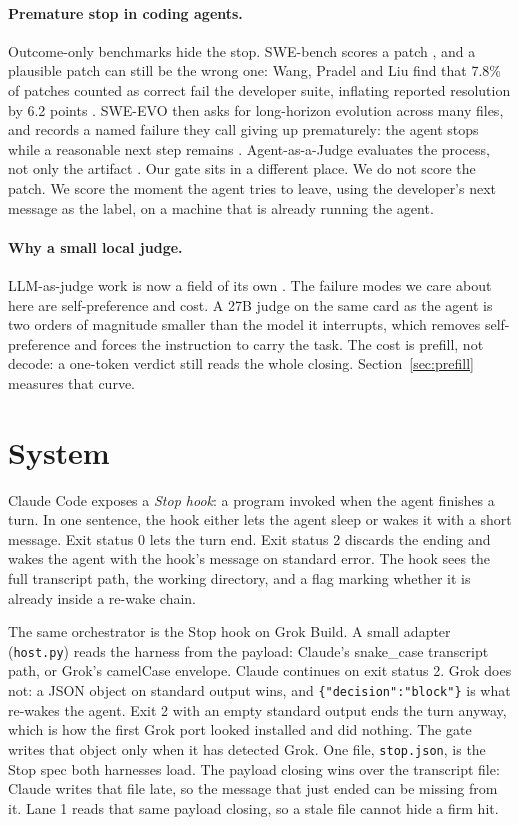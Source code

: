 \paragraph{Premature stop in coding agents.}
Outcome-only benchmarks hide the stop. SWE-bench scores a patch
\cite{jimenez2024swebench}, and a plausible patch can still be the wrong
one: Wang, Pradel and Liu find that 7.8\% of patches counted as correct
fail the developer suite, inflating reported resolution by 6.2 points
\cite{wang2025solved}. SWE-EVO then asks for long-horizon evolution
across many files, and records a named failure they call giving up
prematurely: the agent stops while a reasonable next step remains
\cite{le2025sweevo}. Agent-as-a-Judge evaluates the process, not only
the artifact \cite{zhuge2024agentjudge}. Our gate sits in a different
place. We do not score the patch. We score the moment the agent tries
to leave, using the developer's next message as the label, on a machine
that is already running the agent.

\paragraph{Why a small local judge.}
LLM-as-judge work is now a field of its own
\cite{zheng2023judging}. The failure modes we care about here are
self-preference and cost. A 27B judge on the same card as the agent is
two orders of magnitude smaller than the model it interrupts, which
removes self-preference and forces the instruction to carry the task.
The cost is prefill, not decode: a one-token verdict still reads the
whole closing. Section~\ref{sec:prefill} measures that curve.



\section{System}
\label{sec:system}


Claude Code exposes a \emph{Stop hook}: a program invoked when the agent
finishes a turn. In one sentence, the hook either lets the agent sleep or
wakes it with a short message. Exit status 0 lets the turn end. Exit
status 2 discards the ending and wakes the agent with the hook's message
on standard error. The hook sees the full transcript path, the working
directory, and a flag marking whether it is already inside a re-wake
chain.

The same orchestrator is the Stop hook on Grok Build. A small adapter
(\texttt{host.py}) reads the harness from the payload: Claude's snake\_case
transcript path, or Grok's camelCase envelope. Claude continues on exit
status 2. Grok does not: a JSON object on standard output wins, and
\texttt{\{"decision":"block"\}} is what re-wakes the agent. Exit 2 with an
empty standard output ends the turn anyway, which is how the first Grok port
looked installed and did nothing. The gate writes that object only when it
has detected Grok. One file,
\texttt{stop.json}, is the Stop spec both harnesses load.
The payload closing wins over the transcript file: Claude writes that
file late, so the message that just ended can be missing from it.
Lane 1 reads that same payload closing, so a stale file cannot hide a
firm hit.

